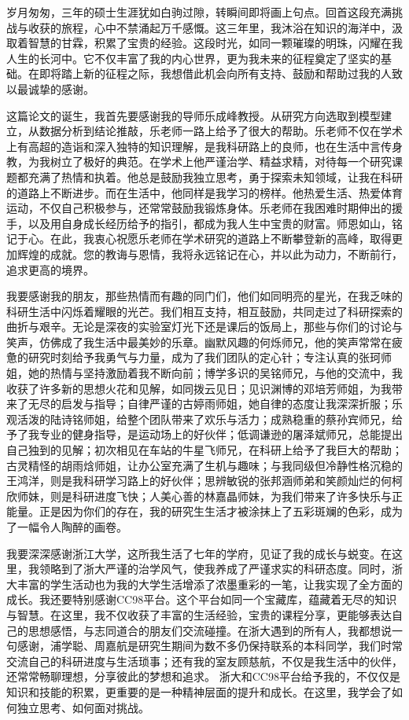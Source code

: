 \cleardoublepage

岁月匆匆，三年的硕士生涯犹如白驹过隙，转瞬间即将画上句点。回首这段充满挑战与收获的旅程，心中不禁涌起万千感慨。这三年里，我沐浴在知识的海洋中，汲取着智慧的甘霖，积累了宝贵的经验。这段时光，如同一颗璀璨的明珠，闪耀在我人生的长河中。它不仅丰富了我的内心世界，更为我未来的征程奠定了坚实的基础。在即将踏上新的征程之际，我想借此机会向所有支持、鼓励和帮助过我的人致以最诚挚的感谢。

这篇论文的诞生，我首先要感谢我的导师乐成峰教授。从研究方向选取到模型建立，从数据分析到结论推敲，乐老师一路上给予了很大的帮助。乐老师不仅在学术上有高超的造诣和深入独特的知识理解，是我科研路上的良师，也在生活中言传身教，为我树立了极好的典范。在学术上他严谨治学、精益求精，对待每一个研究课题都充满了热情和执着。他总是鼓励我独立思考，勇于探索未知领域，让我在科研的道路上不断进步。而在生活中，他同样是我学习的榜样。他热爱生活、热爱体育运动，不仅自己积极参与，还常常鼓励我锻炼身体。乐老师在我困难时期伸出的援手，以及用自身成长经历给予的指引，都成为我人生中宝贵的财富。师恩如山，铭记于心。在此，我衷心祝愿乐老师在学术研究的道路上不断攀登新的高峰，取得更加辉煌的成就。您的教诲与恩情，我将永远铭记在心，并以此为动力，不断前行，追求更高的境界。

我要感谢我的朋友，那些热情而有趣的同门们，他们如同明亮的星光，在我乏味的科研生活中闪烁着耀眼的光芒。我们相互支持，相互鼓励，共同走过了科研探索的曲折与艰辛。无论是深夜的实验室灯光下还是课后的饭局上，那些与你们的讨论与笑声，仿佛成了我生活中最美妙的乐章。幽默风趣的何烁师兄，他的笑声常常在疲惫的研究时刻给予我勇气与力量，成为了我们团队的定心针；专注认真的张珂师姐，她的热情与坚持激励着我不断向前；博学多识的吴铭师兄，与他的交流中，我收获了许多新的思想火花和见解，如同拨云见日；见识渊博的邓培芳师姐，为我带来了无尽的启发与指导；自律严谨的古婷雨师姐，她自律的态度让我深深折服；乐观活泼的陆诗铭师姐，给整个团队带来了欢乐与活力；成熟稳重的蔡孙宾师兄，给予了我专业的健身指导，是运动场上的好伙伴；低调谦逊的屠泽斌师兄，总能提出自己独到的见解；初次相见在车站的牛星飞师兄，在科研上给予了我巨大的帮助；古灵精怪的胡雨焓师姐，让办公室充满了生机与趣味；与我同级但冷静性格沉稳的王鸿洋，则是我科研学习路上的好伙伴；思辨敏锐的张邦涵师弟和笑颜灿烂的何柯欣师妹，则是科研进度飞快；人美心善的林嘉晶师妹，为我们带来了许多快乐与正能量。正是因为你们的存在，我的研究生生活才被涂抹上了五彩斑斓的色彩，成为了一幅令人陶醉的画卷。

我要深深感谢浙江大学，这所我生活了七年的学府，见证了我的成长与蜕变。在这里，我领略到了浙大严谨的治学风气，使我养成了严谨求实的科研态度。同时，浙大丰富的学生活动也为我的大学生活增添了浓墨重彩的一笔，让我实现了全方面的成长。我还要特别感谢CC98平台。这个平台如同一个宝藏库，蕴藏着无尽的知识与智慧。在这里，我不仅收获了丰富的生活经验，宝贵的课程分享，更能够表达自己的思想感悟，与志同道合的朋友们交流碰撞。在浙大遇到的所有人，我都想说一句感谢，浦学聪、周嘉航是研究生期间为数不多仍保持联系的本科同学，我们时常交流自己的科研进度与生活琐事；还有我的室友顾慈航，不仅是我生活中的伙伴，还常常畅聊理想，分享彼此的梦想和追求。
浙大和CC98平台给予我的，不仅仅是知识和技能的积累，更重要的是一种精神层面的提升和成长。在这里，我学会了如何独立思考、如何面对挑战。

